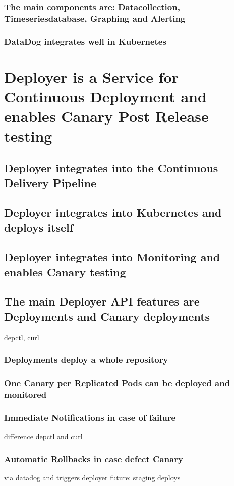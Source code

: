 \subsubsection{The main components are: Datacollection, Timeseriesdatabase, Graphing and Alerting}
\subsubsection{DataDog integrates well in Kubernetes}
\section{Deployer is a Service for Continuous Deployment and enables Canary Post Release testing}
\subsection{Deployer integrates into the Continuous Delivery Pipeline}
\subsection{Deployer integrates into Kubernetes and deploys itself}
\subsection{Deployer integrates into Monitoring and enables Canary testing}
\subsection{The main Deployer API features are Deployments and Canary deployments}
depctl, curl
\subsubsection{Deployments deploy a whole repository}
\subsubsection{One Canary per Replicated Pods can be deployed and monitored}
\subsubsection{Immediate Notifications in case of failure}
difference depctl and curl
\subsubsection{Automatic Rollbacks in case defect Canary}
via datadog and triggers deployer
future: staging deploys

